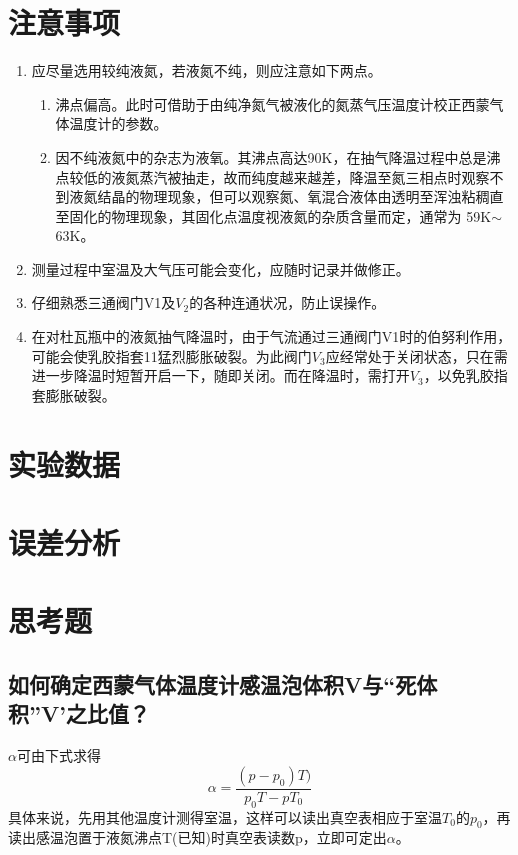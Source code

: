 \documentclass[a4paper]{article}
\begin{document}
\section{注意事项}
\begin{enumerate}
\item 应尽量选用较纯液氮，若液氮不纯，则应注意如下两点。
\begin{enumerate}
\item 沸点偏高。此时可借助于由纯净氮气被液化的氮蒸气压温度计校正西蒙气体温度计的参数。
\item 因不纯液氮中的杂志为液氧。其沸点高达90K，在抽气降温过程中总是沸点较低的液氮蒸汽被抽走，故而纯度越来越差，降温至氮三相点时观察不到液氮结晶的物理现象，但可以观察氮、氧混合液体由透明至浑浊粘稠直至固化的物理现象，其固化点温度视液氮的杂质含量而定，通常为 59K$\sim$63K。
\end{enumerate}
\item 测量过程中室温及大气压可能会变化，应随时记录并做修正。
\item 仔细熟悉三通阀门V1及$V_2$的各种连通状况，防止误操作。
\item 在对杜瓦瓶中的液氮抽气降温时，由于气流通过三通阀门V1时的伯努利作用，可能会使乳胶指套11猛烈膨胀破裂。为此阀门$V_3$应经常处于关闭状态，只在需进一步降温时短暂开启一下，随即关闭。而在降温时，需打开$V_3$，以免乳胶指套膨胀破裂。
\end{enumerate}

\section{实验数据}

\section{误差分析}

\section{思考题}
\subsection{如何确定西蒙气体温度计感温泡体积V与“死体积”V’之比值？}
$\alpha$可由下式求得
\begin{equation*}
\alpha = \frac{(p - p_0)T)}{p_0T - pT_0}
\end{equation*}
具体来说，先用其他温度计测得室温，这样可以读出真空表相应于室温$T_0$的$p_0$，再读出感温泡置于液氮沸点T(已知)时真空表读数p，立即可定出$\alpha$。
\end{document}

